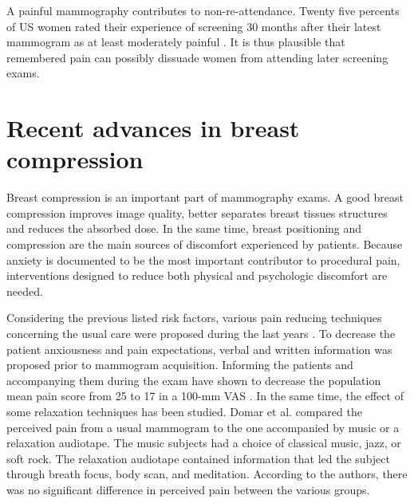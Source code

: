 A painful mammography contributes to non-re-attendance. Twenty five percents of US women rated their experience of screening 30
months after their latest mammogram as at least moderately painful \cite{peipins_impact_2006}. It is thus plausible that remembered pain can possibly dissuade women from
attending later screening exams.

\section{Recent advances in breast compression}\label{section:compressionrecentadvances}

Breast compression is an important part of mammography exams. A good breast compression improves image quality, better separates breast tissues structures and reduces the absorbed dose. In the same time, breast positioning and compression are the main sources of discomfort experienced by patients. Because anxiety is documented to be the most important contributor to procedural pain, interventions designed to reduce both physical and psychologic discomfort are needed.


Considering the previous listed risk factors, various pain reducing techniques concerning the usual care were proposed during the last years \citep{miller_interventions_2008}. To decrease the patient anxiousness and pain expectations, verbal and written information was proposed prior to mammogram acquisition. Informing the patients and accompanying them during the exam have shown to decrease the population mean pain score from 25 to 17 in a 100-mm VAS \citep{shrestha_effect_2001}. In the same time, the effect of some relaxation techniques has been studied. Domar et al. \cite{ domar_relaxation_2005} compared the perceived pain from a usual mammogram to the one  accompanied by music or a relaxation audiotape. The music subjects had a choice of classical music, jazz, or soft rock.  The relaxation audiotape contained information that led the subject through breath focus, body scan, and meditation. According to the authors, there was no significant difference in perceived pain between the various groups. 

